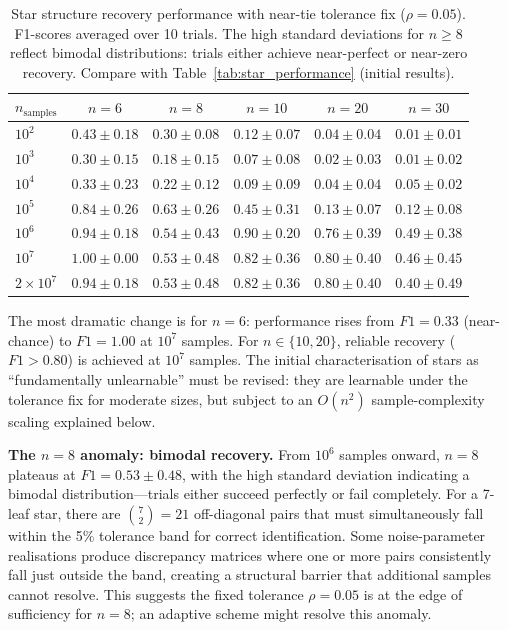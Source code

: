 \documentclass[11pt,a4paper]{article}
\numberwithin{equation}{section}
\begin{document}
\begin{table}[h]
\centering
\caption{Star structure recovery performance with near-tie tolerance fix
($\rho = 0.05$).  F1-scores averaged over 10 trials.  The high standard deviations
for $n \geq 8$ reflect bimodal distributions: trials either achieve near-perfect or
near-zero recovery.  Compare with Table~\ref{tab:star_performance} (initial results).}
\label{tab:star_performance_fixed}
\begin{tabular}{lccccc}
\toprule
$n_{\text{samples}}$ & $n=6$ & $n=8$ & $n=10$ & $n=20$ & $n=30$ \\
\midrule
$10^2$ & $0.43 \pm 0.18$ & $0.30 \pm 0.08$ & $0.12 \pm 0.07$ & $0.04 \pm 0.04$ & $0.01 \pm 0.01$ \\
$10^3$ & $0.30 \pm 0.15$ & $0.18 \pm 0.15$ & $0.07 \pm 0.08$ & $0.02 \pm 0.03$ & $0.01 \pm 0.02$ \\
$10^4$ & $0.33 \pm 0.23$ & $0.22 \pm 0.12$ & $0.09 \pm 0.09$ & $0.04 \pm 0.04$ & $0.05 \pm 0.02$ \\
$10^5$ & $0.84 \pm 0.26$ & $0.63 \pm 0.26$ & $0.45 \pm 0.31$ & $0.13 \pm 0.07$ & $0.12 \pm 0.08$ \\
$10^6$ & $0.94 \pm 0.18$ & $0.54 \pm 0.43$ & $0.90 \pm 0.20$ & $0.76 \pm 0.39$ & $0.49 \pm 0.38$ \\
$10^7$ & $\mathbf{1.00 \pm 0.00}$ & $0.53 \pm 0.48$ & $0.82 \pm 0.36$ & $0.80 \pm 0.40$ & $0.46 \pm 0.45$ \\
$2 \times 10^7$ & $0.94 \pm 0.18$ & $0.53 \pm 0.48$ & $0.82 \pm 0.36$ & $0.80 \pm 0.40$ & $0.40 \pm 0.49$ \\
\bottomrule
\end{tabular}
\end{table}

The most dramatic change is for $n=6$: performance rises from $F1 = 0.33$ (near-chance)
to $F1 = 1.00$ at $10^7$ samples.  For $n \in \{10, 20\}$, reliable recovery
($F1 > 0.80$) is achieved at $10^7$ samples.  The initial characterisation of stars as
``fundamentally unlearnable'' must be revised: they are learnable under the tolerance
fix for moderate sizes, but subject to an $O(n^2)$ sample-complexity scaling explained
below.

\textbf{The $n=8$ anomaly: bimodal recovery.}  From $10^6$ samples onward, $n=8$
plateaus at $F1 = 0.53 \pm 0.48$, with the high standard deviation indicating a
bimodal distribution---trials either succeed perfectly or fail completely.  For a
7-leaf star, there are $\binom{7}{2} = 21$ off-diagonal pairs that must simultaneously
fall within the 5\% tolerance band for correct identification.  Some noise-parameter
realisations produce discrepancy matrices where one or more pairs consistently fall
just outside the band, creating a structural barrier that additional samples cannot
resolve.  This suggests the fixed tolerance $\rho = 0.05$ is at the edge of
sufficiency for $n=8$; an adaptive scheme might resolve this anomaly.
\end{document}
